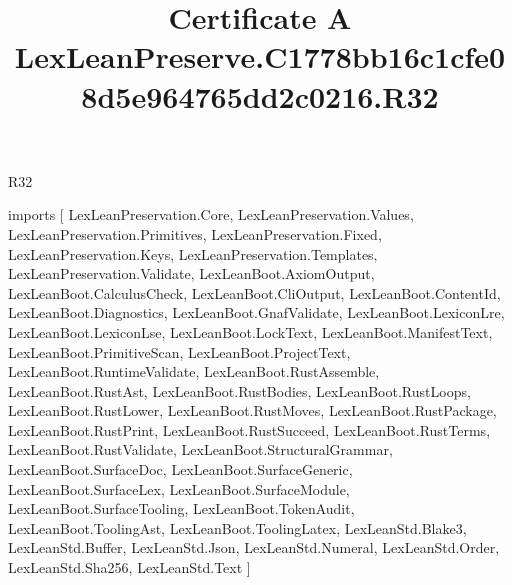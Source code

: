 \begin{lexlean}{R32}
\title{Certificate A LexLeanPreserve.C1778bb16c1cfe08d5e964765dd2c0216.R32}
\begin{coremodule}
imports [
  LexLeanPreservation.Core,
  LexLeanPreservation.Values,
  LexLeanPreservation.Primitives,
  LexLeanPreservation.Fixed,
  LexLeanPreservation.Keys,
  LexLeanPreservation.Templates,
  LexLeanPreservation.Validate,
  LexLeanBoot.AxiomOutput,
  LexLeanBoot.CalculusCheck,
  LexLeanBoot.CliOutput,
  LexLeanBoot.ContentId,
  LexLeanBoot.Diagnostics,
  LexLeanBoot.GnafValidate,
  LexLeanBoot.LexiconLre,
  LexLeanBoot.LexiconLse,
  LexLeanBoot.LockText,
  LexLeanBoot.ManifestText,
  LexLeanBoot.PrimitiveScan,
  LexLeanBoot.ProjectText,
  LexLeanBoot.RuntimeValidate,
  LexLeanBoot.RustAssemble,
  LexLeanBoot.RustAst,
  LexLeanBoot.RustBodies,
  LexLeanBoot.RustLoops,
  LexLeanBoot.RustLower,
  LexLeanBoot.RustMoves,
  LexLeanBoot.RustPackage,
  LexLeanBoot.RustPrint,
  LexLeanBoot.RustSucceed,
  LexLeanBoot.RustTerms,
  LexLeanBoot.RustValidate,
  LexLeanBoot.StructuralGrammar,
  LexLeanBoot.SurfaceDoc,
  LexLeanBoot.SurfaceGeneric,
  LexLeanBoot.SurfaceLex,
  LexLeanBoot.SurfaceModule,
  LexLeanBoot.SurfaceTooling,
  LexLeanBoot.TokenAudit,
  LexLeanBoot.ToolingAst,
  LexLeanBoot.ToolingLatex,
  LexLeanStd.Blake3,
  LexLeanStd.Buffer,
  LexLeanStd.Json,
  LexLeanStd.Numeral,
  LexLeanStd.Order,
  LexLeanStd.Sha256,
  LexLeanStd.Text
]


\end{coremodule}
\end{lexlean}
